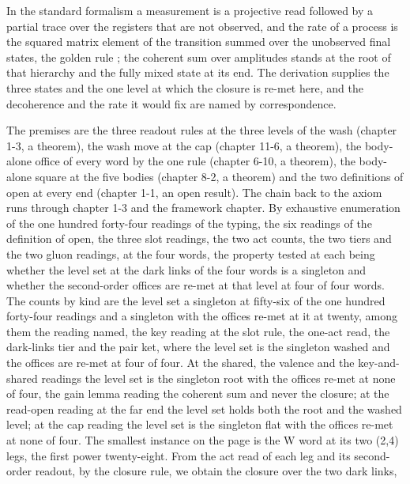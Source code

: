 \begin{chbridge}
In the standard formalism a measurement is a projective read followed by a partial trace over the registers that are not observed, and the rate of a process is the squared matrix element of the transition summed over the unobserved final states, the golden rule \cite{Dirac1927,vonNeumann1932}; the coherent sum over amplitudes stands at the root of that hierarchy and the fully mixed state at its end. The derivation supplies the three states and the one level at which the closure is re-met here, and the decoherence and the rate it would fix are named by correspondence.
\end{chbridge}
\begin{chproof}
The premises are the three readout rules at the three levels of the wash (chapter 1-3, a theorem), the wash move at the cap (chapter 11-6, a theorem), the body-alone office of every word by the one rule (chapter 6-10, a theorem), the body-alone square at the five bodies (chapter 8-2, a theorem) and the two definitions of open at every end (chapter 1-1, an open result). The chain back to the axiom runs through chapter 1-3 and the framework chapter. By exhaustive enumeration of the one hundred forty-four readings of the typing, the six readings of the definition of open, the three slot readings, the two act counts, the two tiers and the two gluon readings, at the four words, the property tested at each being whether the level set at the dark links of the four words is a singleton and whether the second-order offices are re-met at that level at four of four words. The counts by kind are the level set a singleton at fifty-six of the one hundred forty-four readings and a singleton with the offices re-met at it at twenty, among them the reading named, the key reading at the slot rule, the one-act read, the dark-links tier and the pair ket, where the level set is the singleton washed and the offices are re-met at four of four. At the shared, the valence and the key-and-shared readings the level set is the singleton root with the offices re-met at none of four, the gain lemma reading the coherent sum and never the closure; at the read-open reading at the far end the level set holds both the root and the washed level; at the cap reading the level set is the singleton flat with the offices re-met at none of four.
The smallest instance on the page is the W word at its two (2,4) legs, the first power twenty-eight. From the act read of each leg and its second-order readout, by the closure rule, we obtain the closure over the two dark links,

\end{chproof}
